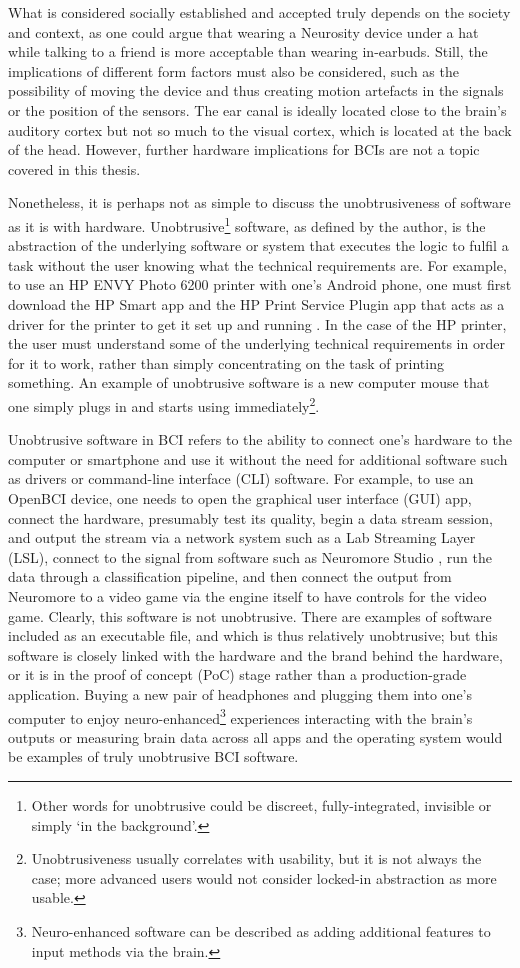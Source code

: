 What is considered socially established and accepted truly depends on the society and context, as one could argue that wearing a Neurosity device under a hat while talking to a friend is more acceptable than wearing in-earbuds. Still, the implications of different form factors must also be considered, such as the possibility of moving the device and thus creating motion artefacts in the signals or the position of the sensors. The ear canal is ideally located close to the brain’s auditory cortex but not so much to the visual cortex, which is located at the back of the head. However, further hardware implications for BCIs are not a topic covered in this thesis.

Nonetheless, it is perhaps not as simple to discuss the unobtrusiveness of software as it is with hardware. Unobtrusive\footnote{Other words for unobtrusive could be discreet, fully-integrated, invisible or simply ‘in the background’.} software, as defined by the author, is the abstraction of the underlying software or system that executes the logic to fulfil a task without the user knowing what the technical requirements are. For example, to use an HP ENVY Photo 6200 printer with one’s Android phone, one must first download the HP Smart app and the HP Print Service Plugin app that acts as a driver for the printer to get it set up and running \citep{hp_hp_nodate}. In the case of the HP printer, the user must understand some of the underlying technical requirements in order for it to work, rather than simply concentrating on the task of printing something. An example of unobtrusive software is a new computer mouse that one simply plugs in and starts using immediately\footnote{Unobtrusiveness usually correlates with usability, but it is not always the case; more advanced users would not consider locked-in abstraction as more usable.}.

Unobtrusive software in BCI refers to the ability to connect one's hardware to the computer or smartphone and use it without the need for additional software such as drivers or command-line interface (CLI) software. For example, to use an OpenBCI device, one needs to open the graphical user interface (GUI) app, connect the hardware, presumably test its quality, begin a data stream session, and output the stream via a network system such as a Lab Streaming Layer (LSL), connect to the signal from software such as Neuromore Studio \citep{openbci_neuromore_nodate}, run the data through a classification pipeline, and then connect the output from Neuromore to a video game via the engine itself to have controls for the video game. Clearly, this software is not unobtrusive. There are examples of software included as an executable file, and which is thus relatively unobtrusive; but this software is closely linked with the hardware and the brand behind the hardware, or it is in the proof of concept (PoC) stage rather than a production-grade application. Buying a new pair of headphones and plugging them into one’s computer to enjoy neuro-enhanced\footnote{Neuro-enhanced software can be described as adding additional features to input methods via the brain.} experiences interacting with the brain’s outputs or measuring brain data across all apps and the operating system would be examples of truly unobtrusive BCI software.

